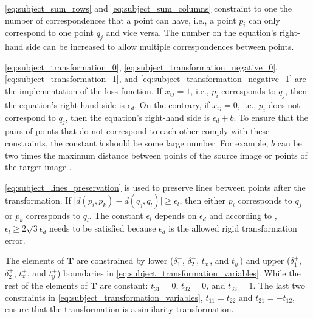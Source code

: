         \autoref{eq:subject_sum_rows} and \autoref{eq:subject_sum_columns} constraint to one the number of correspondences that a point can have,
        i.e., a point $p_i$ can only correspond to one point $q_j$ and vice versa. 
        The number on the equation’s right-hand side can be increased to allow multiple correspondences between points.

        \autoref{eq:subject_transformation_0}, \autoref{eq:subject_transformation_negative_0}, 
        \autoref{eq:subject_transformation_1}, and \autoref{eq:subject_transformation_negative_1} are the implementation of the loss function. 
        If $x_{ij} = 1$, i.e., $p_i$ corresponds to $q_j$, then the equation’s right-hand side is $\epsilon_d$. 
        On the contrary, if $x_{ij} = 0$, i.e., $p_i$ does not correspond to $q_j$, then the equation’s right-hand side is $\epsilon_d + b$.
        To ensure that the pairs of points that do not correspond to each other comply with these constraints, the constant $b$ should be some large number. 
        For example, $b$ can be two times the maximum distance between points of the source image or points of the target image \cite{Goebbels_2018_alinear}. 

        \autoref{eq:subject_lines_preservation} is used to preserve lines between points after the transformation.
        If $\mid d(p_i, p_k) - d(q_j, q_l) \mid \geq \epsilon_l$, then either $p_i$ corresponds to $q_j$ or $p_k$ corresponds to $q_l$.
        The constant $\epsilon_l$ depends on $\epsilon_d$ and according to \cite{Sakakubara_2007_automatic}, 
        $\epsilon_l \geq 2 \sqrt{3} \epsilon_d$ needs to be satisfied because $\epsilon_d$ is the allowed rigid transformation error.

        The elements of $\pmb{T}$ are constrained by lower ($\delta_1^-$, $\delta_2^-$, $t_x^-$, and $t_y^-$)
        and upper ($\delta_1^+$, $\delta_2^+$, $t_x^+$, and $t_y^+$) boundaries in \autoref{eq:subject_transformation_variables}. 
        While the rest of the elements of $\pmb{T}$ are constant: $t_{31} = 0$, $t_{32} = 0$, and $t_{33} = 1$.
        The last two constraints in \autoref{eq:subject_transformation_variables}, $t_{11} = t_{22}$ and $t_{21} = -t_{12}$,
        ensure that the transformation is a similarity transformation.
          

